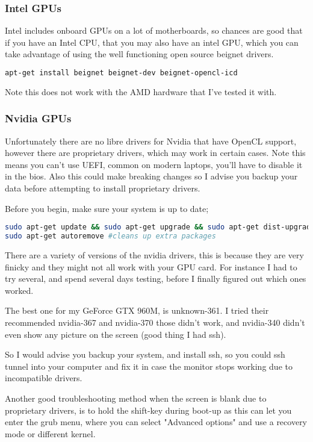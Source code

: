 \documentclass[12pt]{article}
\begin{document}
\subsubsection{Intel GPUs}
Intel includes onboard GPUs on a lot of motherboards, 
so chances are good that if you have an Intel CPU, that you may also have an
intel GPU, which you can take advantage of using the well functioning open
source beignet drivers.

\begin{lstlisting}[language=bash]
apt-get install beignet beignet-dev beignet-opencl-icd
\end{lstlisting}

Note this does not work with the AMD hardware that I've tested it with.

\subsubsection{Nvidia GPUs}
Unfortunately there are no libre drivers for Nvidia that have OpenCL support,
however there are proprietary drivers, which may work in certain cases. 
Note this means you can't use UEFI, common on modern laptops, you'll have to
disable it in the bios.  Also this could make breaking changes so I advise you
backup your data before attempting to install proprietary drivers. 

Before you begin, make sure your system is up to date;
\begin{lstlisting}[language=bash]
sudo apt-get update && sudo apt-get upgrade && sudo apt-get dist-upgrade;
sudo apt-get autoremove #cleans up extra packages
\end{lstlisting}

There are a variety of versions of the nvidia drivers, this is because they are
very finicky and they might not all work with your GPU card.  For instance I had
to try several, and spend several days testing, before I finally figured out
which ones worked. 

The best one for my GeForce GTX 960M, is unknown-361. I tried their recommended
nvidia-367 and nvidia-370 those didn't work, and nvidia-340 didn't even show any
picture on the screen (good thing I had ssh). 

So I would advise you backup your system, and install ssh, so you could ssh
tunnel into your computer and fix it in case the monitor stops working due to
incompatible drivers. 

Another good troubleshooting method when the screen is blank due to proprietary
drivers, is to hold the shift-key during boot-up as this can let you enter the
grub menu, where you can select "Advanced options" and use a recovery mode or
different kernel. 
\end{document}

